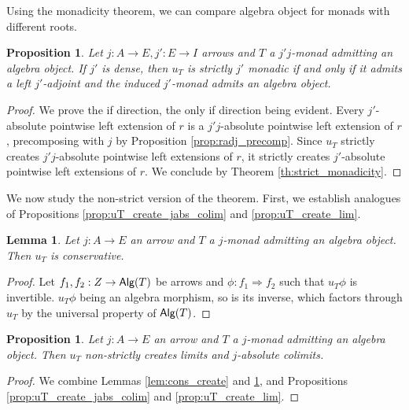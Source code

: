 \documentclass[10pt,a4paper]{article}
\newcommand{\cat}[1]{\textcat{#1}}
\newcommand{\textcat}[1]{{\normalfont\textsf{#1}}}
\newcommand{\To}{\Rightarrow}
\DeclareMathOperator{\Alg}{\cat{Alg}}
\theoremstyle{plain}
\newtheorem{proposition}[theorem]{Proposition}
\newtheorem{lemma}[theorem]{Lemma}
\theoremstyle{definition}
\theoremstyle{remark}
\begin{document}
Using the monadicity theorem, we can compare algebra object for monads with different roots.

\begin{proposition}
    Let $j : A \to E, j' : E \to I$ arrows and $T$ a $j'j$-monad admitting an algebra object. If $j'$ is dense, then $u_T$ is strictly $j'$ monadic if and only if it admits a left $j'$-adjoint and the induced $j'$-monad admits an algebra object.
\end{proposition}

\begin{proof}
    We prove the if direction, the only if direction being evident. Every $j'$-absolute pointwise left extension of $r$ is a $j'j$-absolute pointwise left extension of $r$, precomposing with $j$ by Proposition \ref{prop:radj_precomp}. Since $u_T$ strictly creates $j'j$-absolute pointwise left extensions of $r$, it strictly creates $j'$-absolute pointwise left extensions of $r$. We conclude by Theorem \ref{th:strict_monadicity}.
\end{proof}

We now study the non-strict version of the theorem. First, we establish analogues of Propositions \ref{prop:uT_create_jabs_colim} and \ref{prop:uT_create_lim}.

\begin{lemma}
    \label{lem:uT_cons}
    Let $j : A \to E$ an arrow and $T$ a $j$-monad admitting an algebra object. Then $u_T$ is conservative.
\end{lemma}

\begin{proof}
    Let $f_1, f_2 : Z\to\Alg(T)$ be arrows and $\phi : f_1\To f_2$ such that $u_T\phi$ is invertible. $u_T\phi$ being an algebra morphism, so is its inverse, which factors through $u_T$ by the universal property of $\Alg(T)$.
\end{proof}

\begin{proposition}
    \label{prop:uT_nscreate_co_lim}
    Let $j : A \to E$ an arrow and $T$ a $j$-monad admitting an algebra object. Then $u_T$ non-strictly creates limits and $j$-absolute colimits.
\end{proposition}

\begin{proof}
    We combine Lemmas \ref{lem:cons_create} and \ref{lem:uT_cons}, and Propositions \ref{prop:uT_create_jabs_colim} and \ref{prop:uT_create_lim}.
\end{proof}
\end{document}
